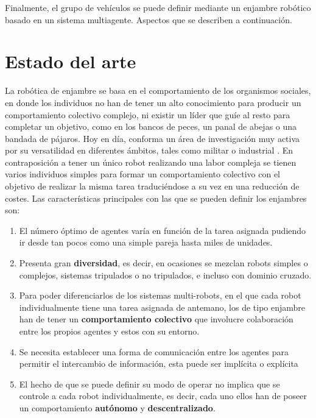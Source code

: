 Finalmente, el grupo de vehículos se puede definir mediante un enjambre robótico basado en un sistema multiagente. Aspectos que se describen a continuación.

\section{Estado del arte}\label{Objetives}

La robótica de enjambre se basa en el comportamiento de los organismos sociales, en donde los individuos no han de tener un alto conocimiento para producir un comportamiento colectivo complejo, ni existir un líder que guíe al resto para completar un objetivo, como en los bancos de peces, un panal de abejas o una bandada de pájaros.
\newpage
Hoy en día, conforma un área de investigación muy activa por su versatilidad en diferentes ámbitos, tales como militar \cite{Aplicaciones_Militares} o industrial \cite{Aplicacion_2}. En contraposición a tener un único robot realizando una labor compleja se tienen varios individuos simples para formar un comportamiento colectivo con el objetivo de realizar la misma tarea traduciéndose a su vez en una reducción de costes. Las características principales con las que se pueden definir los enjambres son:

\begin{enumerate}
	\item El número óptimo de agentes varía en función de la tarea asignada pudiendo ir desde tan pocos como una simple pareja hasta miles de unidades.
	\item Presenta gran \textbf{diversidad}, es decir, en ocasiones se mezclan robots simples o complejos, sistemas tripulados o no tripulados, e incluso con dominio cruzado.
	\item Para poder diferenciarlos de los sistemas multi-robots, en el que cada robot individualmente tiene una tarea asignada de antemano, los de tipo enjambre han de tener un \textbf{comportamiento colectivo} que involucre colaboración entre los propios agentes y estos con su entorno.
	\item Se necesita establecer una forma de comunicación entre los agentes para permitir el intercambio de información, esta puede ser implícita o explícita
	\item El hecho de que se puede definir su modo de operar no implica que se controle a cada robot individualmente, es decir, cada uno ellos han de poseer un comportamiento \textbf{autónomo} y \textbf{descentralizado}.
\end{enumerate}

